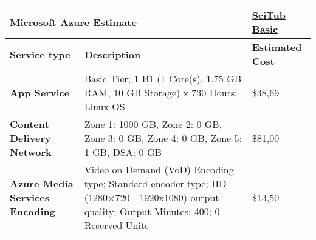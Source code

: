 %

\begin{adjustbox}{angle=90}
                \begin{tabularx}{\textheight}{|l||X|m{4cm}|}
                \hline
                \multicolumn{2}{|l|}{{\ul \textbf{Microsoft Azure Estimate}}}                     & {\ul \textbf{SciTub Basic}}                         \\ \hline
                \textbf{Service type}             & \textbf{Description}                                                                                                                                                                         & \textbf{Estimated Cost}                  \\ \hline\hline
                \textbf{App Service}              & Basic Tier; 1 B1 (1 Core(s), 1.75 GB RAM, 10 GB Storage) x 730 Hours; Linux OS                                                                                                               & \$38,69                                  \\ \hline
                \textbf{Content Delivery Network} & Zone 1: 1000 GB, Zone 2: 0 GB, Zone 3: 0 GB, Zone 4: 0 GB, Zone 5: 1 GB, DSA: 0 GB                                                                                                             & \$81,00                                   \\ \hline
                \textbf{Azure Media Services Encoding}      & Video on Demand (VoD) Encoding type; Standard encoder type; HD (1280×720 - 1920x1080) output quality; Output Minutes: 400;  0 Reserved Units                                        & \$13,50                                   \\ \hline

\end{tabularx}
\end{adjustbox}
